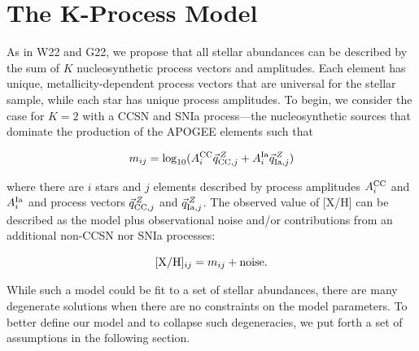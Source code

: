 \documentclass[modern]{aastex631}
\newcommand{\xh}{[{\rm X}/{\rm H}]}
\newcommand{\ejg}[1]{\textcolor{red}{EJG: #1}}
\begin{document}


\section{The K-Process Model}\label{sec:model}

As in W22 and G22, we propose that all stellar abundances can be described by the sum of $K$ nucleosynthetic process vectors and amplitudes. Each element has unique, metallicity-dependent process vectors that are universal for the stellar sample, while each star has unique process amplitudes. To begin, we consider the case for $K=2$ with a CCSN and SNIa process---the nucleosynthetic sources that dominate the production of the APOGEE elements \citep[e.g.,][]{andrews2017} such that

\begin{equation} \label{eq:m_ij}
    m_{ij} = \log_{10}(A_i^{\rm CC} \vec{q}_{{\rm CC}, j}^{\,Z} + A_i^{\rm Ia} \vec{q}_{{\rm Ia}, j}^{\,Z}) 
\end{equation}

where there are $i$ stars and $j$ elements described by process amplitudes $A_i^{\rm CC}$ and $A_i^{\rm Ia}$ and process vectors $\vec{q}_{{\rm CC}, j}^{\,Z}$ and $\vec{q}_{{\rm Ia}, j}^{\,Z}$. The observed value of [X/H] can be described as the model plus observational noise and/or contributions from an additional non-CCSN nor SNIa processes:

\begin{equation} \label{eq:xh}
    \xh_{ij} = m_{ij} + \text{noise}.
\end{equation}

While such a model could be fit to a set of stellar abundances, there are many degenerate solutions when there are no constraints on the model parameters. To better define our model and to collapse such degeneracies, we put forth a set of assumptions in the following section.
\end{document}
